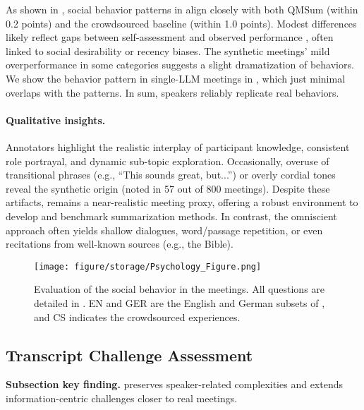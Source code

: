 As shown in , social behavior patterns in \dataset{} align closely with both QMSum (within 0.2 points) and the crowdsourced baseline (within 1.0 points). 
Modest differences likely reflect gaps between self-assessment and observed performance \cite{kruger1999unskilled},  often linked to social desirability or recency biases.
The synthetic meetings’ mild overperformance in some categories suggests a slight dramatization of behaviors.
We show the behavior pattern in single-LLM meetings in , which just minimal overlaps with the \dataset{} patterns.
In sum, \pipeline{} speakers reliably replicate real behaviors.



\paragraph{Qualitative insights.}
Annotators highlight the realistic interplay of participant knowledge, consistent role portrayal, and dynamic sub-topic exploration.
Occasionally, overuse of transitional phrases (e.g., “This sounds great, but...”) or overly cordial tones reveal the synthetic origin (noted in 57 out of 800 meetings).
Despite these artifacts, \dataset{} remains a near-realistic meeting proxy, offering a robust environment to develop and benchmark summarization methods.
In contrast, the omniscient approach often yields shallow dialogues, word/passage repetition, or even recitations from well-known sources (e.g., the Bible).




\begin{figure}[t]
    \centering
    \texttt{[image: figure/storage/Psychology\_Figure.png]}
    \caption{Evaluation of the social behavior in the meetings. All questions are detailed in . EN and GER are the English and German subsets of \dataset{}, and CS indicates the crowdsourced experiences.}
    \label{fig:psychology_grounded_evaluation}
\end{figure}


\subsection{Transcript Challenge Assessment}
\label{sec:challenges}
\noindent
\textbf{Subsection key finding.} 
\dataset{} preserves speaker-related complexities and extends information-centric challenges closer to real meetings.

